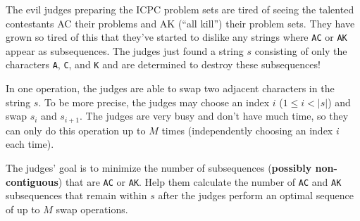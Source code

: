 


The evil judges preparing the ICPC problem sets are tired of seeing the talented contestants AC their problems and AK (``all kill'') their problem sets. They have grown so tired of this that they've started to dislike any strings where \texttt{AC} or \texttt{AK} appear as subsequences. The judges just found a string $s$ consisting of only the characters \texttt{A}, \texttt{C}, and \texttt{K} and are determined to destroy these subsequences!

In one operation, the judges are able to swap two adjacent characters in the string $s$. To be more precise,
the judges may choose an index $i$ ($1 \le i < |s|$) and swap $s_i$ and $s_{i+1}$. The judges are very busy and don't have much time, so
they can only do this operation up to $M$ times (independently choosing an index $i$ each time).

The judges' goal is to minimize the number of subsequences (\textbf{possibly non-contiguous}) that are \texttt{AC} or \texttt{AK}.
Help them calculate the number of \texttt{AC} and \texttt{AK} subsequences that remain within $s$ after the judges perform an optimal sequence of up to $M$ swap operations.

